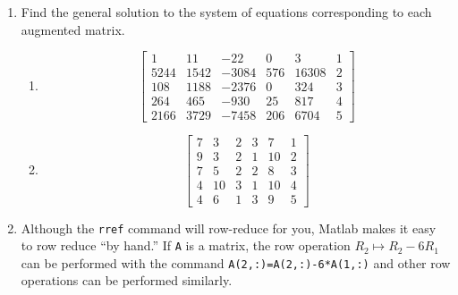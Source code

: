 \documentclass[letter]{article}
\begin{document}
	\begin{enumerate}
		\item Find the general solution to the system of equations corresponding to each augmented matrix.
			\begin{enumerate}
				\item \[\left[\begin{array}{ccccc|c}
				       1&    11&   -22&     0&     3&1 \\
				    5244&  1542& -3084&   576& 16308&2\\
				     108&  1188& -2376&     0&   324&3\\
				     264&   465&  -930&    25&   817&4\\
				    2166&  3729& -7458&   206&  6704&5
					\end{array}\right]\]
				\item \[\left[\begin{array}{ccccc|c}
						    7&  3&  2&  3&  7&  1 \\
						    9&  3&  2&  1& 10&  2\\
						    7&  5&  2&  2&  8&  3\\
						    4& 10&  3&  1& 10&  4\\
						    4&  6&  1&  3&  9&  5
				    \end{array}\right]
					\]
			\end{enumerate}
		
		\item Although the \texttt{rref} command will row-reduce for you, Matlab makes it easy
			to row reduce ``by hand.''  If \texttt{A} is a matrix, the row operation 
			$R_2\mapsto R_2-6R_1$ can be performed with the command \texttt{A(2,:)=A(2,:)-6*A(1,:)}
			and other row operations can be performed similarly.


\end{enumerate}
\end{document}

